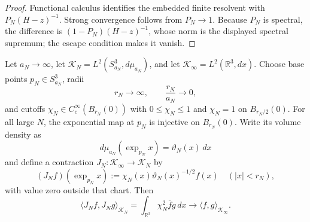 \documentclass[12pt,a4paper]{article}
\begin{document}
\begin{proof}
Functional calculus identifies the embedded finite resolvent with
\(P_N(H-z)^{-1}\).  Strong convergence follows from \(P_N\to1\).  Because
\(P_N\) is spectral, the difference is
\((1-P_N)(H-z)^{-1}\), whose norm is the displayed spectral supremum; the
escape condition makes it vanish.
\end{proof}

\begin{theorem}
\label{p4:thm:expanding-sphere-mosco-interface}
Let \(a_N\to\infty\), let
\(\mathcal K_N=L^2(S^3_{a_N},d\mu_{a_N})\), and let
\(\mathcal K_\infty=L^2(\mathbb R^3,dx)\).  Choose base points
\(p_N\in S^3_{a_N}\), radii
\[
 r_N\longrightarrow\infty,
 \qquad
 \frac{r_N}{a_N}\longrightarrow0,
\]
and cutoffs \(\chi_N\in C_c^\infty(B_{r_N}(0))\) with
\(0\le\chi_N\le1\) and \(\chi_N=1\) on \(B_{r_N/2}(0)\).  For all large
\(N\), the exponential map at \(p_N\) is injective on \(B_{r_N}(0)\).
Write its volume density as
\[
 d\mu_{a_N}(\exp_{p_N}x)=\vartheta_N(x)\,dx
\]
and define a contraction
\(J_N:\mathcal K_\infty\to\mathcal K_N\) by
\begin{equation}
\label{p4:eq:expanding-sphere-identification-map}
 (J_Nf)(\exp_{p_N}x)
 :=
 \chi_N(x)\vartheta_N(x)^{-1/2}f(x)
 \quad (|x|<r_N),
\end{equation}
with value zero outside that chart.  Then
\begin{equation}
\label{p4:eq:expanding-sphere-asymptotic-isometry}
 \langle J_Nf,J_Ng\rangle_{\mathcal K_N}
 =
 \int_{\mathbb R^3}\chi_N^2\overline f g\,dx
 \longrightarrow
 \langle f,g\rangle_{\mathcal K_\infty}.
\end{equation}


\end{theorem}
\end{document}
